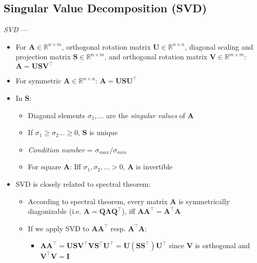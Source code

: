 \subsection*{Singular Value Decomposition (SVD)}
\emph{SVD} --- 
\begin{itemize}
    \item For $\boldsymbol{A} \in \mathbb{R}^{n \times m}$, orthogonal rotation matrix $\boldsymbol{U} \in \mathbb{R}^{n \times n}$, diagonal scaling and projection matrix $\boldsymbol{S} \in \mathbb{R}^{n \times m}$, and orthogonal rotation matrix $\boldsymbol{V} \in \mathbb{R}^{m \times m}$: $\boldsymbol{A} = \boldsymbol{U} \boldsymbol{S} \boldsymbol{V}^\intercal$
    \item For symmetric $\boldsymbol{A} \in \mathbb{R}^{n \times n}$: $\boldsymbol{A} = \boldsymbol{U} \boldsymbol{S} \boldsymbol{U}^\intercal$
    \item In $\boldsymbol{S}$:
    \begin{itemize}
        \item Diagonal elements $\sigma_1, ...$ are the \emph{singular values} of $\boldsymbol{A}$
        \item If $\sigma_1 \geq \sigma_2 ... \geq 0$, $\boldsymbol{S}$ is unique
        \item \emph{Condition number} = $\sigma_{max} / \sigma_{min}$
        \item For square $\boldsymbol{A}$: Iff $\sigma_1, \sigma_2, ... > 0$, $\boldsymbol{A}$ is invertible 
    \end{itemize}
    \item SVD is closely related to spectral theorem:
    \begin{itemize}
        \item According to spectral theorem, every matrix $\boldsymbol{A}$ is symmetrically diagonizable (i.e. $\boldsymbol{A} = \boldsymbol{Q} \boldsymbol{\Lambda} \boldsymbol{Q}^\intercal$), iff $\boldsymbol{A}\boldsymbol{A}^\intercal = \boldsymbol{A}^\intercal\boldsymbol{A}$
        \item If we apply SVD to $\boldsymbol{A}\boldsymbol{A}^\intercal$ resp. $\boldsymbol{A}^\intercal\boldsymbol{A}$:
        \begin{itemize}
            \item $\boldsymbol{A}\boldsymbol{A}^\intercal = \boldsymbol{U}\boldsymbol{S}\boldsymbol{V}^\intercal\boldsymbol{V}\boldsymbol{S}^\intercal\boldsymbol{U}^\intercal = \boldsymbol{U}(\boldsymbol{S}\boldsymbol{S}^\intercal)\boldsymbol{U}^\intercal$ since $\boldsymbol{V}$ is orthogonal and $\boldsymbol{V}^\intercal \boldsymbol{V} = \boldsymbol{I}$

\end{itemize}
\end{itemize}
\end{itemize}

